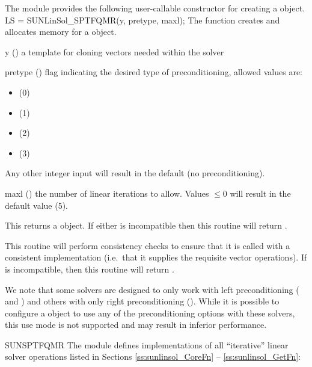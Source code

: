 The {\sunlinsolsptfqmr} module provides the following user-callable constructor
for creating a \newline {} object.
%
%
{
  LS = SUNLinSol\_SPTFQMR(y, pretype, maxl);
}
{
  The function  creates and allocates memory for
  a {\sptfqmr} \newline {} object.
}
{
  \begin{args}[pretype]
  \item[y] ()
    a template for cloning vectors needed within the solver
  \item[pretype] ()
    flag indicating the desired type of preconditioning, allowed
    values are:
    \begin{itemize}
    \item {} (0)
    \item {} (1)
    \item {} (2)
    \item {} (3)
    \end{itemize}
    Any other integer input will result in the default (no
    preconditioning).
  \item[maxl] ()
    the number of linear iterations to allow. Values $\le0$ will
    result in the default value (5).
  \end{args}
}
{
  This returns a  object.  If either  is
  incompatible then this routine will return .
}
{
  This routine will perform consistency checks to ensure that it is
  called with a consistent {\nvector} implementation (i.e.~that it
  supplies the requisite vector operations).  If  is
  incompatible, then this routine will return .

  We note that some {\sundials} solvers are designed to only work
  with left preconditioning ({\ida} and {\idas}) and others with only
  right preconditioning ({\kinsol}). While it is possible to configure
  a {\sunlinsolsptfqmr} object to use any of the preconditioning options
  with these solvers, this use mode is not supported and may result in
  inferior performance.
}
{SUNSPTFQMR}
%
%
The {\sunlinsolsptfqmr} module defines implementations of all
``iterative'' linear solver operations listed in Sections
\ref{ss:sunlinsol_CoreFn} -- \ref{ss:sunlinsol_GetFn}:
